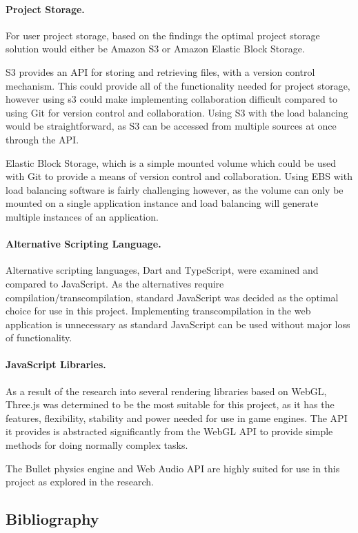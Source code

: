 \documentclass[a4paper, 12pt]{article}
\begin{document}
\paragraph{Project Storage.}
For user project storage, based on the findings the optimal project storage solution would either be Amazon S3 or Amazon Elastic Block Storage.

S3 provides an API for storing and retrieving files, with a version control mechanism. This could provide all of the functionality needed for project storage, however using s3 could make implementing collaboration difficult compared to using Git for version control and collaboration. Using S3 with the load balancing would be straightforward, as S3 can be accessed from multiple sources at once through the API.

Elastic Block Storage, which is a simple mounted volume which could be used with Git to provide a means of version control and collaboration. Using EBS with load balancing software is fairly challenging however, as the volume can only be mounted on a single application instance and load balancing will generate multiple instances of an application.

\paragraph{Alternative Scripting Language.}
Alternative scripting languages, Dart and TypeScript, were examined and compared to JavaScript. As the alternatives require compilation/transcompilation, standard JavaScript was decided as the optimal choice for use in this project. Implementing transcompilation in the web application is unnecessary as standard JavaScript can be used without major loss of functionality.

\paragraph{JavaScript Libraries.}
As a result of the research into several rendering libraries based on WebGL, Three.js was determined to be the most suitable for this project, as it has the features, flexibility, stability and power needed for use in game engines. The API it provides is abstracted significantly from the WebGL API to provide simple methods for doing normally complex tasks.

The Bullet physics engine and Web Audio API are highly suited for use in this project as explored in the research.

\subsection{Bibliography}
{}

\end{document}
